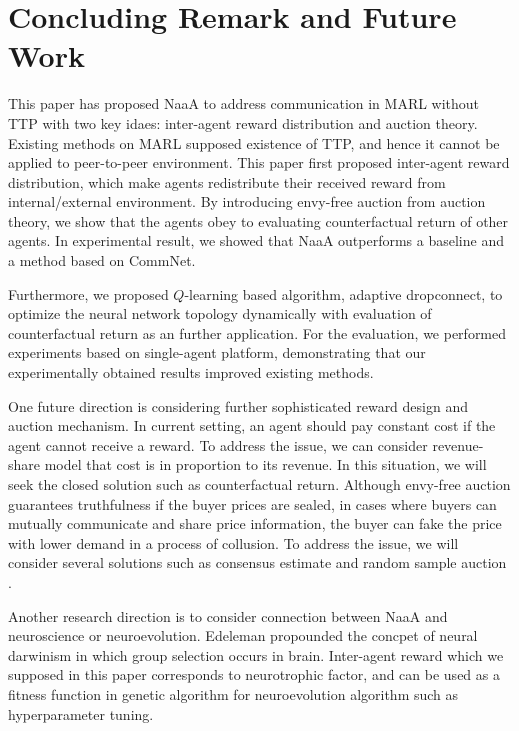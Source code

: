 \section{Concluding Remark and Future Work}
This paper has proposed NaaA to address communication in MARL without TTP with two key idaes: inter-agent reward distribution and auction theory.
Existing methods on MARL supposed existence of TTP, and hence it cannot be applied to peer-to-peer environment.
This paper first proposed inter-agent reward distribution, which make agents redistribute their received reward from internal/external environment.
By introducing envy-free auction from auction theory, we show that the agents obey to evaluating counterfactual return of other agents.
In experimental result, we showed that NaaA outperforms a baseline and a method based on CommNet.

Furthermore, we proposed $Q$-learning based algorithm, adaptive dropconnect, to optimize the neural network topology dynamically with evaluation of counterfactual return as an further application.
For the evaluation, we performed experiments based on single-agent platform, demonstrating that our experimentally obtained results improved existing methods.

One future direction is considering further sophisticated reward design and auction mechanism.
In current setting, an agent should pay constant cost if the agent cannot receive a reward.
To address the issue, we can consider revenue-share model that cost is in proportion to its revenue.
In this situation, we will seek the closed solution such as counterfactual return.
Although envy-free auction guarantees truthfulness if the buyer prices are sealed,
in cases where buyers can mutually communicate and share price information, 
the buyer can fake the price with lower demand in a process of collusion.
To address the issue, we will consider several solutions such as consensus estimate \citep{goldberg2003competitiveness} and random sample auction \citep{goldberg2006competitive}.


Another research direction is to consider connection between NaaA and neuroscience or neuroevolution.
Edeleman propounded the concpet of neural darwinism \citep{edelman1987neural} in which group selection occurs in brain.
Inter-agent reward which we supposed in this paper corresponds to neurotrophic factor,
and can be used as a fitness function in genetic algorithm for neuroevolution algorithm such as hyperparameter tuning.

